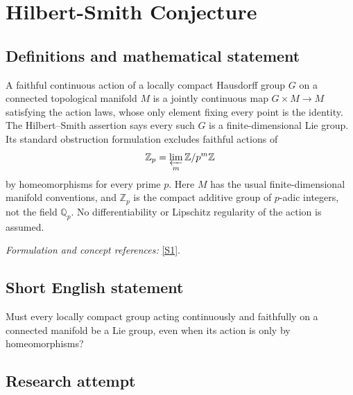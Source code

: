 \documentclass[11pt,a4paper]{article}
\newcommand{\Z}{\mathbb{Z}}
\newcommand{\Q}{\mathbb{Q}}
\newcommand{\sref}[2]{\hyperlink{source:#1:#2}{[S#2]}}
\newif\ifshowcatalogue
\newcommand{\cataloguescope}[1]{\ifshowcatalogue
 \paragraph{Exact scope in the supplied catalogue.}
 \begin{quote}\small #1\end{quote}\fi}
\begin{document}
\setcounter{section}{206}
\clearpage
\section{\texorpdfstring{Hilbert-Smith Conjecture}{Hilbert-Smith Conjecture}}\label{207}
\subsection{Definitions and mathematical statement}
A faithful continuous action of a locally compact Hausdorff group $G$ on a connected topological manifold $M$ is a jointly continuous map $G\times M\to M$ satisfying the action laws, whose only element fixing every point is the identity. The Hilbert--Smith assertion says every such $G$ is a finite-dimensional Lie group. Its standard obstruction formulation excludes faithful actions of
\[
 \Z_p=\varprojlim_m\Z/p^m\Z
\]
by homeomorphisms for every prime $p$. Here $M$ has the usual finite-dimensional manifold conventions, and $\Z_p$ is the compact additive group of $p$-adic integers, not the field $\Q_p$. No differentiability or Lipschitz regularity of the action is assumed.
\par\smallskip\textit{Formulation and concept references:} \sref{207}{1}.
\cataloguescope{Prove that every locally compact topological group acting faithfully on a connected topological manifold is a Lie group; equivalently, prove that Z\_p admits no faithful action by homeomorphisms on a connected manifold.}
\subsection{Short English statement}
Must every locally compact group acting continuously and faithfully on a connected manifold be a Lie group, even when its action is only by homeomorphisms?
\subsection{Research attempt}
\end{document}
